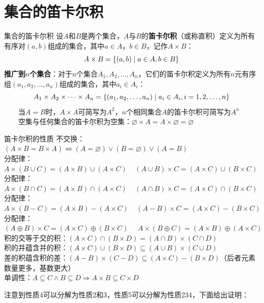 \documentclass[lang=cn,11pt]{elegantbook}
\begin{document}
\section{集合的笛卡尔积}
\begin{definition}{集合的笛卡尔积}
设$A$和$B$是两个集合，$A$与$B$的\textbf{笛卡尔积}（或称直积）定义为所有有序对$(a,b)$组成的集合，其中$a \in A$，$b \in B$，记作$A \times B$：\vspace{-10pt}
$$A \times B = \{(a,b) \mid a \in A, b \in B\}\vspace{-10pt}$$
\textbf{推广到$n$个集合}：对于$n$个集合$A_1, A_2, \ldots, A_n$，它们的笛卡尔积定义为所有$n$元有序组$(a_1, a_2, \ldots, a_n)$组成的集合，其中$a_i \in A_i$：
\vspace{-10pt}$$A_1 \times A_2 \times \cdots \times A_n = \{(a_1, a_2, \ldots, a_n) \mid a_i \in A_i, i = 1,2,\ldots,n\}\vspace{-10pt}$$
~~~~当$A = B$时，$A \times A$可简写为$A^2$，$n$个相同集合$A$的笛卡尔积可简写为$A^n$\\
~~~~空集与任何集合的笛卡尔积为空集：$\varnothing \times A = A \times \varnothing = \varnothing$
\end{definition}
\begin{theorem}{笛卡尔积的性质}
不交换：$(A\times B=B\times A)\Leftrightarrow (A=\varnothing)\lor(B=\varnothing)\lor(A=B)$\\
分配律：$A\times(B\cup C)=(A\times B)\cup(A\times C)~~~~~(A\cup B)\times C=(A\times C)\cup(B\times C)$\\
分配律：$A\times(B\cap C)=(A\times B)\cap(A\times C)~~~~~(A\cap B)\times C=(A\times C)\cap(B\times C)$\\
分配律：$A\times(B-C)=(A\times B)-(A\times C)~~~~~(A-B)\times C=(A\times C)-(B\times C)$\\
分配律：$(A\oplus B)\times C=(A\times C)\oplus(B\times C)~~~~~~A\times(B\oplus C)=(A\times B)\oplus(A\times C)$\\
积的交等于交的积：$(A\times C)\cap(B\times D)=(A\cap B)\times(C\cap D)$\\
积的并蕴含并的积：$(A\times C)\cup(B\times D)\subseteq(A\cup B)\times(C\cup D)$\\
差的积蕴含积的差：$(A-B)\times(C-D)\subseteq (A\times C)-(B\times D)$（后者元素数量更多，基数更大）\\
单调性：$A\subseteq C\land B\subseteq D\Rightarrow A\times B\subseteq C\times D$
\end{theorem}
注意到性质4可以分解为性质2和3，性质5可以分解为性质234，下面给出证明：\vspace{-10pt}
\end{document}
